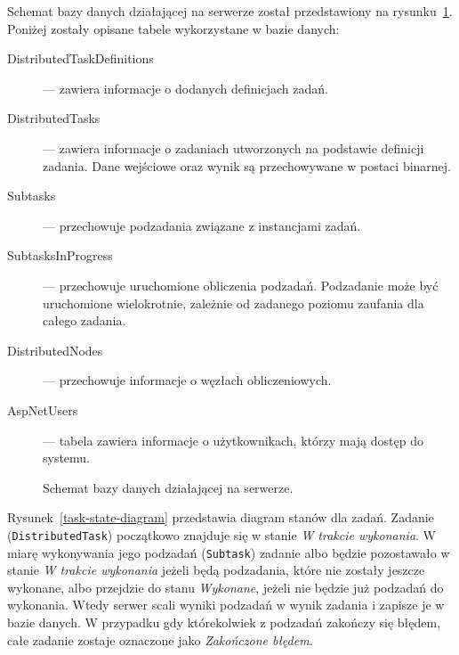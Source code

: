 \documentclass[a4paper,11pt,twoside]{report}
\theoremstyle{definition}
\begin{document}
Schemat bazy danych działającej na serwerze został przedstawiony na rysunku~\ref{database-schema}.
Poniżej zostały opisane tabele wykorzystane w bazie danych:
\begin{description}
    \item [DistributedTaskDefinitions] --- zawiera informacje o dodanych definicjach zadań.
    \item [DistributedTasks] --- zawiera informacje o zadaniach utworzonych na podstawie definicji zadania. Dane wejściowe oraz wynik są przechowywane w postaci binarnej.
    \item [Subtasks] --- przechowuje podzadania związane z instancjami zadań.
    \item [SubtasksInProgress] --- przechowuje uruchomione obliczenia podzadań. Podzadanie może być uruchomione wielokrotnie, zależnie od zadanego poziomu zaufania dla całego zadania.
    \item [DistributedNodes] --- przechowuje informacje o węzłach obliczeniowych.
    \item [AspNetUsers] --- tabela zawiera informacje o użytkownikach, którzy mają dostęp do systemu.
\end{description}

\begin{figure} 
    \caption{Schemat bazy danych działającej na serwerze.}
    \label{database-schema}
\end{figure}


Rysunek~\ref{task-state-diagram} przedstawia diagram stanów dla zadań.
Zadanie (\texttt{DistributedTask}) początkowo znajduje się w stanie \textit{W trakcie wykonania}. W miarę wykonywania jego podzadań (\texttt{Subtask}) zadanie albo będzie pozostawało w stanie \textit{W trakcie wykonania} jeżeli będą podzadania, które nie zostały jeszcze wykonane, albo przejdzie do stanu \textit{Wykonane}, jeżeli nie będzie już podzadań do wykonania. Wtedy serwer scali wyniki podzadań w wynik zadania i zapisze je w bazie danych. W przypadku gdy którekolwiek z podzadań zakończy się błędem, całe zadanie zostaje oznaczone jako \textit{Zakończone błędem}.
\end{document}

